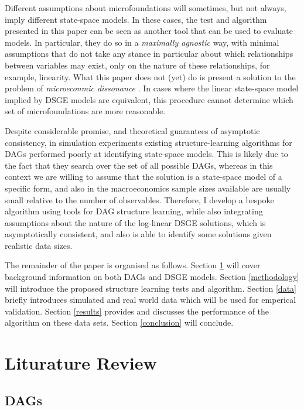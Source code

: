 \documentclass{article}
\begin{document}
Different assumptions about microfoundations will sometimes, but not always, imply different state-space models. In these cases, the test and algorithm presented in this paper can be seen as another tool that can be used to evaluate models. In particular, they do so in a \textit{maximally agnostic} way, with minimal assumptions that do not take any stance in particular about which relationships between variables may exist, only on the nature of these relationships, for example, linearity. What this paper does not (yet) do is present a solution to the problem of \textit{microeconmic dissonance} \parencite{levin2008macroeconometric}. In cases where the linear state-space model implied by DSGE models are equivalent, this procedure cannot determine which set of microfoundations are more reasonable.

Despite considerable promise, and theoretical guarantees of asymptotic consistency, in simulation experiments existing structure-learning algorithms for DAGs performed poorly at identifying state-space models. This is likely due to the fact that they search over the set of all possible DAGs, whereas in this context we are willing to assume that the solution is a state-space model of a specific form, and also in the macroeconomics sample sizes available are usually small relative to the number of observables. Therefore, I develop a bespoke algorithm using tools for DAG structure learning, while also integrating assumptions about the nature of the log-linear DSGE solutions, which is asymptotically consistent, and also is able to identify some solutions given realistic data sizes.

The remainder of the paper is organised as follows. Section \ref{lit_review} will cover background information on both DAGs and DSGE models. Section \ref{methodology} will introduce the proposed structure learning tests and algorithm. Section \ref{data} briefly introduces simulated and real world data which will be used for emperical validation. Section \ref{results} provides and discusses the performance of the algorithm on these data sets. Section \ref{conclusion} will conclude.  

\section{Liturature Review} \label{lit_review}

\subsection{DAGs} \label{dags}
\end{document}

